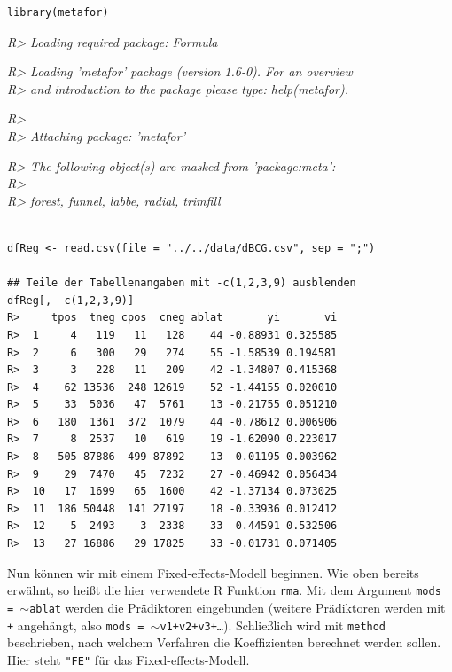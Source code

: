 \documentclass[normalheadings, 10pt]{scrartcl}\usepackage{graphicx, color}
\makeatletter
\newenvironment{kframe}{%
 \def\at@end@of@kframe{}%
 \ifinner\ifhmode%
  \def\at@end@of@kframe{\end{minipage}}%
  \begin{minipage}{\columnwidth}%
 \fi\fi%
 \def\FrameCommand##1{\hskip\@totalleftmargin \hskip-\fboxsep
 \colorbox{shadecolor}{##1}\hskip-\fboxsep
     \hskip-\linewidth \hskip-\@totalleftmargin \hskip\columnwidth}%
 \MakeFramed {\advance\hsize-\width
   \@totalleftmargin\z@ \linewidth\hsize
   \@setminipage}}%
 {\par\unskip\endMakeFramed%
 \at@end@of@kframe}
\newenvironment{knitrout}{}{} %
\newcommand{\code}[1]{\texttt{#1}}
\makeatother
\begin{document}
\begin{rbsp}
\begin{knitrout}
\color{fgcolor}\begin{kframe}
\begin{verbatim}
library(metafor)
\end{verbatim}


{\ttfamily\noindent\itshape\textcolor{messagecolor}{R>  Loading required package: Formula}}

{\ttfamily\noindent\itshape\textcolor{messagecolor}{R>  Loading 'metafor' package (version 1.6-0). For an overview \\R>  and introduction to the package please type: help(metafor).}}

{\ttfamily\noindent\itshape\textcolor{messagecolor}{R>  \\R>  Attaching package: 'metafor'}}

{\ttfamily\noindent\itshape\textcolor{messagecolor}{R>  The following object(s) are masked from 'package:meta':\\R>  \\R>      forest, funnel, labbe, radial, trimfill}}\begin{verbatim}

dfReg <- read.csv(file = "../../data/dBCG.csv", sep = ";")

## Teile der Tabellenangaben mit -c(1,2,3,9) ausblenden
dfReg[, -c(1,2,3,9)]
R>     tpos  tneg cpos  cneg ablat       yi       vi
R>  1     4   119   11   128    44 -0.88931 0.325585
R>  2     6   300   29   274    55 -1.58539 0.194581
R>  3     3   228   11   209    42 -1.34807 0.415368
R>  4    62 13536  248 12619    52 -1.44155 0.020010
R>  5    33  5036   47  5761    13 -0.21755 0.051210
R>  6   180  1361  372  1079    44 -0.78612 0.006906
R>  7     8  2537   10   619    19 -1.62090 0.223017
R>  8   505 87886  499 87892    13  0.01195 0.003962
R>  9    29  7470   45  7232    27 -0.46942 0.056434
R>  10   17  1699   65  1600    42 -1.37134 0.073025
R>  11  186 50448  141 27197    18 -0.33936 0.012412
R>  12    5  2493    3  2338    33  0.44591 0.532506
R>  13   27 16886   29 17825    33 -0.01731 0.071405
\end{verbatim}
\end{kframe}
\end{knitrout}

\end{rbsp}

Nun können wir mit einem Fixed-effects-Modell beginnen. Wie oben bereits
erwähnt, so heißt die hier verwendete R Funktion \code{rma}. Mit dem Argument
\code{mods = $\sim$ablat} werden die Prädiktoren eingebunden (weitere
Prädiktoren werden mit \code{+} angehängt, also \code{mods =
  $\sim$v1+v2+v3+\ldots}). Schließlich wird mit \code{method} beschrieben,
nach welchem Verfahren die Koeffizienten berechnet werden sollen. Hier steht
\code{"FE"} für das Fixed-effects-Modell.
\end{document}
